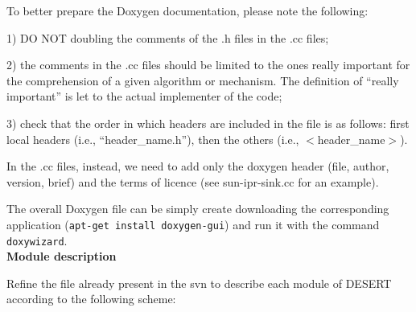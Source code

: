 \documentclass[11pt,journal,draftclsnofoot,onecolumn,twoside,letterpaper]{IEEEtran}
\theoremstyle{definition} \newtheorem{definition}[]{Definition}
\theoremstyle{theorem} \newtheorem{theorem}[]{Theorem}
\begin{document}
To better prepare the Doxygen documentation, please note the following:
\begin{description}
 \item 1) DO NOT doubling the comments of the .h files in the .cc files;
 \item 2) the comments in the .cc files should be limited to the ones really important for the comprehension of a given algorithm or mechanism. The definition of ``really important'' is let to the actual implementer of the code;
 \item 3) check that the order in which headers are included in the file is as follows: first local headers (i.e., ``header\_name.h''), then the others (i.e., $<$header\_name$>$).
\end{description}
In the .cc files, instead, we need to add only the doxygen header (file, author, version, brief) and the terms of licence (see sun-ipr-sink.cc for an example).

The overall Doxygen file can be simply create downloading the corresponding application ({\tt apt-get install doxygen-gui}) and run it with the command {\tt doxywizard}.\\

{\bf Module description}

Refine the file already present in the svn to describe each module of DESERT according to the following scheme:
\end{document}
